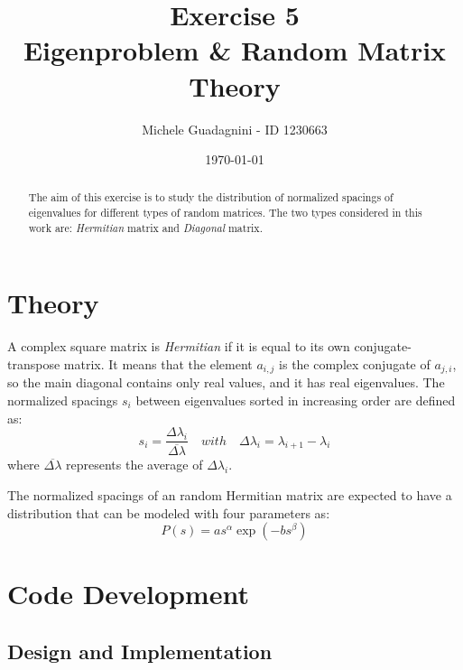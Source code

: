 \documentclass[11pt,a4paper]{article}
\author{Michele Guadagnini - ID 1230663}
\title{\textbf{Exercise 5 \\ Eigenproblem \& Random Matrix Theory}}
\date{\today}
\begin{document}
\maketitle

\vspace{20pt}
\begin{abstract}
	The aim of this exercise is to study the distribution of normalized spacings of eigenvalues for different types of random matrices. 
	The two types considered in this work are: \textit{Hermitian} matrix and \textit{Diagonal} matrix.
\end{abstract}

\section{Theory} %
A complex square matrix is \textit{Hermitian} if it is equal to its own conjugate-transpose matrix. 
It means that the element $a_{i,j}$ is the complex conjugate of $a_{j,i}$, so the main diagonal contains only real values, and it has real eigenvalues.
The normalized spacings $s_i$ between eigenvalues sorted in increasing order are defined as:
\begin{equation}
	s_i = \frac{\Delta\lambda_{i}}{\overline{\Delta\lambda}} \quad with \quad \Delta\lambda_{i} = \lambda_{i+1} - \lambda_i
\end{equation}
where $\overline{\Delta\lambda}$ represents the average of $\Delta\lambda_{i}$.

The normalized spacings of an random Hermitian matrix are expected to have a distribution that can be modeled with four parameters as:
\begin{equation}
	P(s) = as^\alpha \exp(-bs^\beta)
	\label{eq:fitmodel}
\end{equation}

\section{Code Development} %

\subsection{Design and Implementation}
\end{document}

